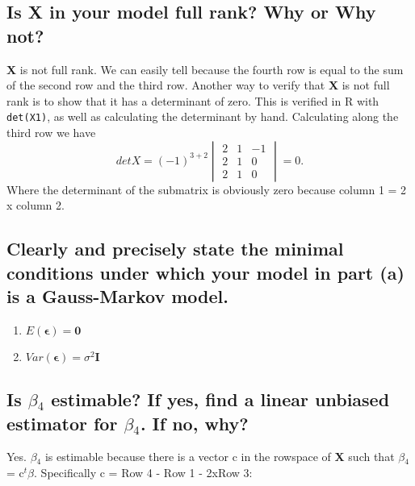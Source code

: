 \documentclass[11pt]{article}
\begin{document}
\subsection{Is \textbf{X} in your model full rank? Why or Why not?}
\label{sec-1-2}


\textbf{X} is not full rank. We can easily tell because the fourth row is
equal to the sum of the second row and the third row.  Another way to
verify that \textbf{X} is not full rank is to show that it has a
determinant of zero. This is verified in R with \verb~det(X1)~, as well as calculating
the determinant by hand. Calculating along the third row we have $$det X =
(-1)^{3+2} \begin{vmatrix} 2 & 1 & -1 \\ 2 & 1 & 0 \\ 2 & 1 & 0
\end{vmatrix} = 0.$$ Where the determinant of the submatrix is
obviously zero because column 1 = 2 x column 2.
\subsection{Clearly and precisely state the minimal conditions under which your model in part (a) is a Gauss-Markov model.}
\label{sec-1-3}


\begin{enumerate}
\item $E(\mathbf{\epsilon}) = \mathbf{0}$
\item $Var(\mathbf{\epsilon}) = \sigma^2\mathbf{I}$
\end{enumerate}

\newpage
\subsection{Is $\beta$$_4$ estimable? If yes, find a linear unbiased estimator for $\beta$$_4$. If no, why?}
\label{sec-1-4}


Yes. $\beta$$_4$ is estimable because there is a vector c in the rowspace
of \textbf{X} such that $\beta$$_4$ = c$^t$$\beta$. Specifically c = Row 4 - Row 1 -
2xRow 3:
\end{document}
